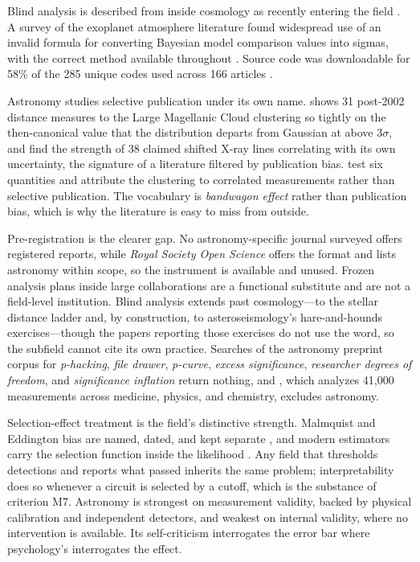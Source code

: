 \documentclass{article}
\begin{document}
Blind analysis is described from inside cosmology as recently entering the field \citep{brieden2020blind}. A survey of the exoplanet atmosphere literature found widespread use of an invalid formula for converting Bayesian model comparison values into sigmas, with the correct method available throughout \citep{thorngren2025bayesian}. Source code was downloadable for 58\% of the 285 unique codes used across 166 articles \citep{allen2018schroedinger}.

Astronomy studies selective publication under its own name. \citet{schaefer2008bandwagon} shows 31 post-2002 distance measures to the Large Magellanic Cloud clustering so tightly on the then-canonical value that the distribution departs from Gaussian at above 3$\sigma$, and \citet{vaughan2008xray} find the strength of 38 claimed shifted X-ray lines correlating with its own uncertainty, the signature of a literature filtered by publication bias. \citet{degrijs2014publication} test six quantities and attribute the clustering to correlated measurements rather than selective publication. The vocabulary is \emph{bandwagon effect} rather than publication bias, which is why the literature is easy to miss from outside.

Pre-registration is the clearer gap. No astronomy-specific journal surveyed offers registered reports, while \emph{Royal Society Open Science} offers the format and lists astronomy within scope, so the instrument is available and unused. Frozen analysis plans inside large collaborations are a functional substitute and are not a field-level institution. Blind analysis extends past cosmology---to the stellar distance ladder and, by construction, to asteroseismology's hare-and-hounds exercises---though the papers reporting those exercises do not use the word, so the subfield cannot cite its own practice. Searches of the astronomy preprint corpus for \emph{p-hacking}, \emph{file drawer}, \emph{p-curve}, \emph{excess significance}, \emph{researcher degrees of freedom}, and \emph{significance inflation} return nothing, and \citet{bailey2017not}, which analyzes 41{,}000 measurements across medicine, physics, and chemistry, excludes astronomy.

Selection-effect treatment is the field's distinctive strength. Malmquist and Eddington bias are named, dated, and kept separate \citep{teerikorpi1997observational}, and modern estimators carry the selection function inside the likelihood \citep{kelly2007some}. Any field that thresholds detections and reports what passed inherits the same problem; interpretability does so whenever a circuit is selected by a cutoff, which is the substance of criterion M7. Astronomy is strongest on measurement validity, backed by physical calibration and independent detectors, and weakest on internal validity, where no intervention is available. Its self-criticism interrogates the error bar where psychology's interrogates the effect.
\end{document}
